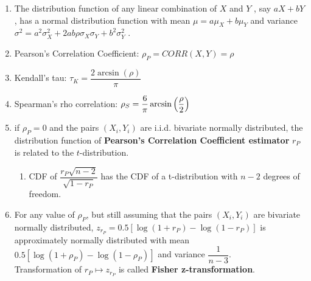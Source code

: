 \begin{enumerate}[series=binvar-normal]
    \item The distribution function of any linear combination of $X$ and $Y$ , say $a X + bY$ , has a normal distribution function with mean $\mu = a\mu_X + b\mu_Y$ and variance $\sigma ^2 = a^2\sigma ^2_X + 2ab\rho \sigma _X \sigma _Y + b^2\sigma ^2_Y$ .
    \hfill \cite{statistics/book/Statistics-for-Data-Scientists/Maurits-Kaptein}

    \item Pearson’s Correlation Coefficient: $\rho_P = CORR(X, Y) = \rho$
    \hfill \cite{statistics/book/Statistics-for-Data-Scientists/Maurits-Kaptein}

    \item Kendall’s tau: $\tau_K = \dfrac{2 \arcsin(\rho)}{\pi}$
    \hfill \cite{statistics/book/Statistics-for-Data-Scientists/Maurits-Kaptein}

    \item Spearman’s rho correlation: $\rho_S = \dfrac{6}{\pi}\arcsin\left(\dfrac{\rho}{2}\right)$
    \hfill \cite{statistics/book/Statistics-for-Data-Scientists/Maurits-Kaptein}

    \item if $\rho_P = 0$ and the pairs $(X_i , Y_i )$ are i.i.d. bivariate normally distributed, the distribution function of \textbf{Pearson’s Correlation Coefficient estimator} $r_P$ is related to the $t$-distribution.
    \hfill \cite{statistics/book/Statistics-for-Data-Scientists/Maurits-Kaptein}
    \begin{enumerate}
        \item  CDF of $\dfrac{r_P \sqrt{n - 2}}{\sqrt{1 - r_P}}$ has the CDF of a t-distribution with $n - 2$ degrees of freedom.
        \hfill \cite{statistics/book/Statistics-for-Data-Scientists/Maurits-Kaptein}

    \end{enumerate}

    \item  For any value of $\rho_P$, but still assuming that the pairs $(X_i , Y_i )$ are bivariate normally distributed, $z_{r_P} = 0.5[\log(1 + r_P ) - \log(1 - r_P )]$ is approximately normally distributed with mean $0.5[\log(1 + \rho_P ) - \log(1 - \rho_P )]$ and variance $\dfrac{1}{n - 3}$.
    \hfill \cite{statistics/book/Statistics-for-Data-Scientists/Maurits-Kaptein}
    \\
    Transformation of $r_P \mapsto z_{r_P}$ is called \textbf{Fisher z-transformation}.
    \hfill \cite{statistics/book/Statistics-for-Data-Scientists/Maurits-Kaptein, common/online/chatgpt}


\end{enumerate}
